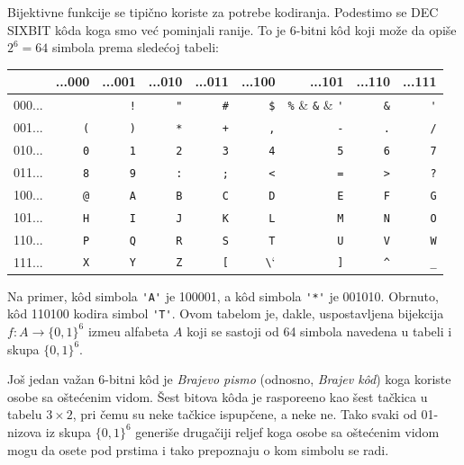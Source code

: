 \begin{EX}\label{ft08.ex.DEC-SIXBIT}
  Bijektivne funkcije se tipi\v cno koriste za potrebe kodiranja. Podestimo se
  DEC SIXBIT k\^oda koga smo ve\'c pominjali ranije. To je 6-bitni k\^od koji mo\v ze da
  opi\v se $2^6 = 64$ simbola prema slede\'coj tabeli:
  \begin{center}
    \begin{tabular}{r|rrrrrrrr}
             & ...000    & ...001   & ...010   & ...011   & ...100   & ...101   & ...110   & ...111  \\
      \hline
      000... & \verb*` ` & \verb`!` & \verb`"` & \verb`#` & \verb`$` & \verb`%` & \verb`&` & \verb`'`\\
      001... & \verb`(`  & \verb`)` & \verb`*` & \verb`+` & \verb`,` & \verb`-` & \verb`.` & \verb`/`\\
      010... & \verb`0`  & \verb`1` & \verb`2` & \verb`3` & \verb`4` & \verb`5` & \verb`6` & \verb`7`\\
      011... & \verb`8`  & \verb`9` & \verb`:` & \verb`;` & \verb`<` & \verb`=` & \verb`>` & \verb`?`\\
      100... & \verb`@`  & \verb`A` & \verb`B` & \verb`C` & \verb`D` & \verb`E` & \verb`F` & \verb`G`\\
      101... & \verb`H`  & \verb`I` & \verb`J` & \verb`K` & \verb`L` & \verb`M` & \verb`N` & \verb`O`\\
      110... & \verb`P`  & \verb`Q` & \verb`R` & \verb`S` & \verb`T` & \verb`U` & \verb`V` & \verb`W`\\
      111... & \verb`X`  & \verb`Y` & \verb`Z` & \verb`[` & \verb`\` & \verb`]` & \verb`^` & \verb`_`
    \end{tabular}
  \end{center}
  Na primer, k\^od simbola \verb`'A'` je 100001, a k\^od simbola \verb`'*'` je 001010.
  Obrnuto, k\^od 110100 kodira simbol \verb`'T'`. Ovom tabelom je, dakle, uspostavljena bijekcija
  $f : A \to \{0,1\}^6$ izme\dj u alfabeta $A$ koji se sastoji od 64 simbola navedena u tabeli
  i skupa $\{0,1\}^6$.
  
  Jo\v s jedan va\v zan 6-bitni k\^od je \emph{Brajevo pismo} (odnosno, \emph{Brajev k\^od}) koga koriste osobe sa o\v ste\'cenim vidom.
  \v Sest bitova k\^oda je raspore\dj eno kao \v sest ta\v ckica u tabelu $3 \times 2$, pri \v cemu su neke ta\v ckice
  ispup\v cene, a neke ne. Tako svaki od 01-nizova iz skupa $\{0, 1\}^6$ generi\v se druga\v ciji reljef koga osobe
  sa o\v ste\'cenim vidom mogu da osete pod prstima i tako prepoznaju o kom simbolu se radi.
\end{EX}

